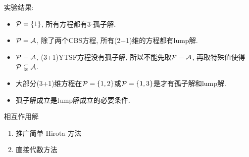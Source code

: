 \begin{frame}
实验结果:
\begin{itemize}
\item $\mathcal{P}=\left\{1\right\}$, 所有方程都有3-孤子解. 
\item $\mathcal{P}=\mathcal{A}$, 除了两个CBS方程, 所有(2+1)维的方程都有lump解. 
\item $\mathcal{P}=\mathcal{A}$, (3+1)YTSF方程没有孤子解, 所以不能先取$\mathcal{P}=\mathcal{A}$, 再取特殊值使得$\mathcal{P}\subsetneq \mathcal{A}$. 
\item 大部分(3+1)维方程在$\mathcal{P}=\left\{1,2\right\}$或$\mathcal{P}=\left\{1,3\right\}$是才有孤子解和lump解.
\item 孤子解成立是lump解成立的必要条件. 
\end{itemize}
\end{frame}

\begin{frame}{相互作用解}
\begin{enumerate}
\item 推广简单 Hirota 方法
\item 直接代数方法
\end{enumerate}
\end{frame}
